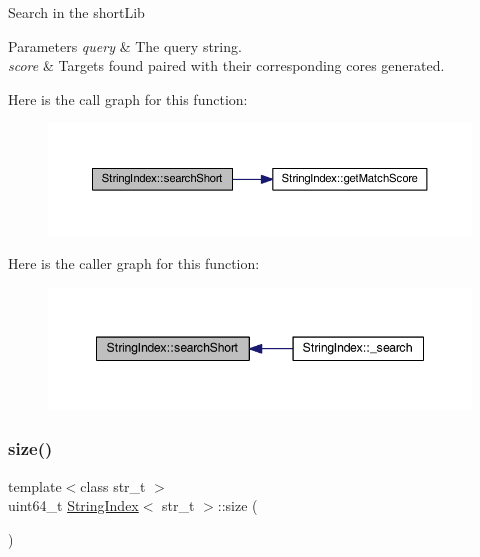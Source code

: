 Search in the short\+Lib 
\begin{DoxyParams}{Parameters}
{\em query} & The query string. \\
\hline
{\em score} & Targets found paired with their corresponding cores generated. \\
\hline
\end{DoxyParams}
Here is the call graph for this function\+:
\nopagebreak
\begin{figure}[H]
\begin{center}
\leavevmode
\includegraphics[width=350pt]{class_string_index_a309f7697439fb3428de3c63dca6cdaa4_cgraph}
\end{center}
\end{figure}
Here is the caller graph for this function\+:
\nopagebreak
\begin{figure}[H]
\begin{center}
\leavevmode
\includegraphics[width=348pt]{class_string_index_a309f7697439fb3428de3c63dca6cdaa4_icgraph}
\end{center}
\end{figure}
\mbox{\label{class_string_index_a95acf789f43ead39b067d1c82d3a9b02}} 
\subsubsection{\texorpdfstring{size()}{size()}}
{\footnotesize\ttfamily template$<$class str\+\_\+t $>$ \\
uint64\+\_\+t \mbox{\hyperlink{class_string_index}{String\+Index}}$<$ str\+\_\+t $>$\+::size (\begin{DoxyParamCaption}{ }\end{DoxyParamCaption})}

